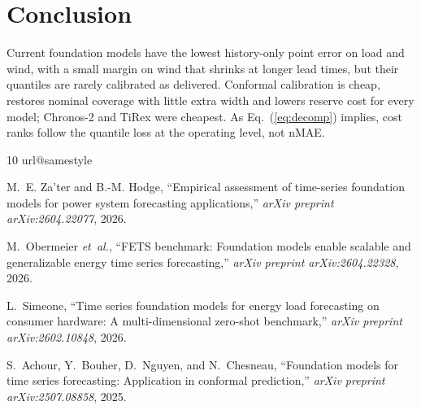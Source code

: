 \documentclass[conference]{IEEEtran}
\begin{document}
\section{Conclusion}
Current foundation models have the lowest history-only point error on load and wind, with a small margin on wind that shrinks at longer lead times, but their quantiles are rarely calibrated as delivered. Conformal calibration is cheap, restores nominal coverage with little extra width and lowers reserve cost for every model; Chronos-2 and TiRex were cheapest. As Eq.~(\ref{eq:decomp}) implies, cost ranks follow the quantile loss at the operating level, not nMAE.

\begin{thebibliography}{10}
\providecommand{\url}[1]{#1}
\csname url@samestyle\endcsname
\providecommand{\newblock}{\relax}
\providecommand{\bibinfo}[2]{#2}
\providecommand{\BIBentrySTDinterwordspacing}{\spaceskip=0pt\relax}
\providecommand{\BIBentryALTinterwordstretchfactor}{4}
\providecommand{\BIBentryALTinterwordspacing}{\spaceskip=0pt plus
\BIBentryALTinterwordstretchfactor\fontdimen3\font minus
  \fontdimen4\font\relax}
\providecommand{\BIBforeignlanguage}[2]{{%
\expandafter\ifx\csname l@#1\endcsname\relax
\typeout{** WARNING: IEEEtran.bst: No hyphenation pattern has been}%
\typeout{** loaded for the language `#1'. Using the pattern for}%
\typeout{** the default language instead.}%
\else
\language=\csname l@#1\endcsname
\fi
#2}}
\providecommand{\BIBdecl}{\relax}
\BIBdecl

M.~E. Za'ter and B.-M. Hodge, ``Empirical assessment of time-series foundation
  models for power system forecasting applications,'' \emph{arXiv preprint
  arXiv:2604.22077}, 2026.

M.~Obermeier \emph{et~al.}, ``{FETS}
  benchmark: Foundation models enable scalable and generalizable energy time
  series forecasting,'' \emph{arXiv preprint arXiv:2604.22328}, 2026.

L.~Simeone, ``Time series foundation models for energy load forecasting on
  consumer hardware: A multi-dimensional zero-shot benchmark,'' \emph{arXiv
  preprint arXiv:2602.10848}, 2026.

S.~Achour, Y.~Bouher, D.~Nguyen, and N.~Chesneau, ``Foundation models for time
  series forecasting: Application in conformal prediction,'' \emph{arXiv
  preprint arXiv:2507.08858}, 2025.


\end{thebibliography}
\end{document}
